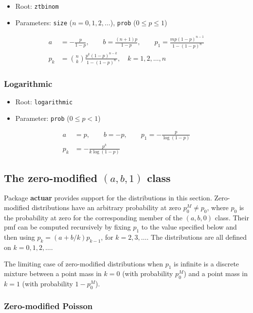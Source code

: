 \documentclass[x11names]{article}
\newcommand{\pkg}[1]{\textbf{#1}}
\newcommand{\code}[1]{\texttt{#1}}
\begin{document}
\begin{itemize}
\item Root: \code{ztbinom}
\item Parameters: \code{size} ($n = 0, 1, 2, \dots$),
  \code{prob} ($0 \leq p \leq 1$)
\end{itemize}
\begin{align*}
  a &= -\frac{p}{1 - p}, \qquad b = \frac{(n + 1)p}{1 - p}, \qquad
      p_1 = \frac{m p (1 - p)^{n - 1}}{1 - (1 - p)^n} \\
  p_k &= \binom{n}{k} \frac{p^k (1 - p)^{n - k}}{1 - (1 - p)^n}, \quad
        k = 1, 2, \dots, n
\end{align*}

\subsubsection{Logarithmic}

\begin{itemize}
\item Root: \code{logarithmic}
\item Parameter: \code{prob} ($0 \leq p < 1$)
\end{itemize}
\begin{align*}
  a &= p, \qquad b = -p, \qquad
      p_1 = - \frac{p}{\log (1 - p)} \\
  p_k &= - \frac{p^k}{k \log (1 - p)}
\end{align*}

\subsection[The zero-modified (a, b, 1) class]{The zero-modified $(a, b, 1)$ class}
\label{sec:app:discrete:zm}

Package \pkg{actuar} provides support for the distributions in this
section. Zero-modified distributions have an arbitrary probability at
zero $p_0^M \neq p_0$, where $p_0$ is the probability at zero for the
corresponding member of the $(a, b, 0)$ class. Their pmf can be
computed recursively by fixing $p_1$ to the value specified below and
then using $p_k = (a + b/k) p_{k - 1}$, for $k = 2, 3, \dots$. The
distributions are all defined on $k = 0, 1, 2, \dots$.

The limiting case of zero-modified distributions when $p_1$ is
infinite is a discrete mixture between a point mass in $k = 0$ (with
probability $p_0^M$) and a point mass in $k = 1$ (with probability
$1 - p_0^M$).

\subsubsection{Zero-modified Poisson}
\end{document}
